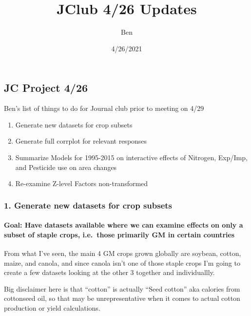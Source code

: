 \documentclass[
]{article}
\title{JClub 4/26 Updates}
\author{Ben}
\date{4/26/2021}
\providecommand{\tightlist}{%
  \setlength{\itemsep}{0pt}\setlength{\parskip}{0pt}}
\begin{document}
\maketitle

\hypertarget{jc-project-426}{%
\subsection{JC Project 4/26}\label{jc-project-426}}

Ben's list of things to do for Journal club prior to meeting on 4/29

\begin{enumerate}
\def\labelenumi{\arabic{enumi}.}
\tightlist
\item
  Generate new datasets for crop subsets
\item
  Generate full corrplot for relevant responses
\item
  Summarize Models for 1995-2015 on interactive effects of Nitrogen,
  Exp/Imp, and Pesticide use on area changes
\item
  Re-examine Z-level Factors non-transformed
\end{enumerate}

\hypertarget{generate-new-datasets-for-crop-subsets}{%
\subsubsection{1. Generate new datasets for crop
subsets}\label{generate-new-datasets-for-crop-subsets}}

\hypertarget{goal-have-datasets-available-where-we-can-examine-effects-on-only-a-subset-of-staple-crops-i.e.-those-primarily-gm-in-certain-countries}{%
\paragraph{Goal: Have datasets available where we can examine effects on
only a subset of staple crops, i.e.~those primarily GM in certain
countries}\label{goal-have-datasets-available-where-we-can-examine-effects-on-only-a-subset-of-staple-crops-i.e.-those-primarily-gm-in-certain-countries}}

From what I've seen, the main 4 GM crops grown globally are soybean,
cotton, maize, and canola, and since canola isn't one of those staple
crops I'm going to create a few datasets looking at the other 3 together
and individuallly.

Big disclaimer here is that ``cotton'' is actually ``Seed cotton'' aka
calories from cottonseed oil, so that may be unrepresentative when it
comes to actual cotton production or yield calculations.
\end{document}
